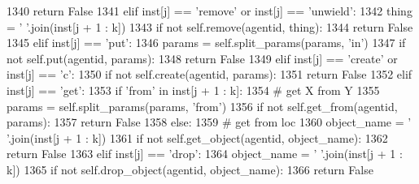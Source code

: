 \begin{DoxyCode}
1340                     \textcolor{keywordflow}{return} \textcolor{keyword}{False}
1341             \textcolor{keywordflow}{elif} inst[j] == \textcolor{stringliteral}{'remove'} \textcolor{keywordflow}{or} inst[j] == \textcolor{stringliteral}{'unwield'}:
1342                 thing = \textcolor{stringliteral}{' '}.join(inst[j + 1 : k])
1343                 \textcolor{keywordflow}{if} \textcolor{keywordflow}{not} self.remove(agentid, thing):
1344                     \textcolor{keywordflow}{return} \textcolor{keyword}{False}
1345             \textcolor{keywordflow}{elif} inst[j] == \textcolor{stringliteral}{'put'}:
1346                 params = self.split\_params(params, \textcolor{stringliteral}{'in'})
1347                 \textcolor{keywordflow}{if} \textcolor{keywordflow}{not} self.put(agentid, params):
1348                     \textcolor{keywordflow}{return} \textcolor{keyword}{False}
1349             \textcolor{keywordflow}{elif} inst[j] == \textcolor{stringliteral}{'create'} \textcolor{keywordflow}{or} inst[j] == \textcolor{stringliteral}{'c'}:
1350                 \textcolor{keywordflow}{if} \textcolor{keywordflow}{not} self.create(agentid, params):
1351                     \textcolor{keywordflow}{return} \textcolor{keyword}{False}
1352             \textcolor{keywordflow}{elif} inst[j] == \textcolor{stringliteral}{'get'}:
1353                 \textcolor{keywordflow}{if} \textcolor{stringliteral}{'from'} \textcolor{keywordflow}{in} inst[j + 1 : k]:
1354                     \textcolor{comment}{# get X from Y}
1355                     params = self.split\_params(params, \textcolor{stringliteral}{'from'})
1356                     \textcolor{keywordflow}{if} \textcolor{keywordflow}{not} self.get\_from(agentid, params):
1357                         \textcolor{keywordflow}{return} \textcolor{keyword}{False}
1358                 \textcolor{keywordflow}{else}:
1359                     \textcolor{comment}{# get from loc}
1360                     object\_name = \textcolor{stringliteral}{' '}.join(inst[j + 1 : k])
1361                     \textcolor{keywordflow}{if} \textcolor{keywordflow}{not} self.get\_object(agentid, object\_name):
1362                         \textcolor{keywordflow}{return} \textcolor{keyword}{False}
1363             \textcolor{keywordflow}{elif} inst[j] == \textcolor{stringliteral}{'drop'}:
1364                 object\_name = \textcolor{stringliteral}{' '}.join(inst[j + 1 : k])
1365                 \textcolor{keywordflow}{if} \textcolor{keywordflow}{not} self.drop\_object(agentid, object\_name):
1366                     \textcolor{keywordflow}{return} \textcolor{keyword}{False}

\end{DoxyCode}
